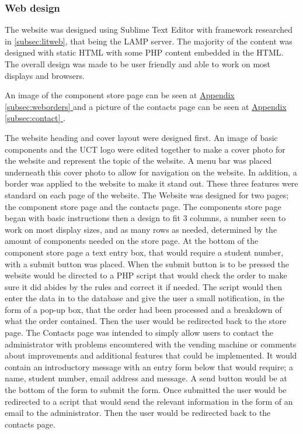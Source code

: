 \documentclass[a4paper,11pt]{article}
\newcommand*{\fullref}[1]{\hyperref[{#1}]{\Appendixautorefname  \ref*{#1} \nameref*{#1}}}
\newcommand*{\Appendixautorefname}{Appendix }
\numberwithin{figure}{section}
\numberwithin{table}{section}
\begin{document}
\subsubsection{Web design}
\label{subsubsec:webdev}

The website was designed using Sublime Text Editor with framework researched in \autoref{subsec:litweb}, that being the LAMP server. The majority of the content was designed with static HTML with some PHP content embedded in the HTML. The overall design was made to be user friendly and able to work on most displays and browsers.

An image of the component store page can be seen at \fullref{subsec:weborders} and a picture of the contacts page can be seen at \fullref{subsec:contact}.

The website heading and cover layout were designed first. An image of basic components and the UCT logo were edited together to make a cover photo for the website and represent the topic of the website. A menu bar was placed underneath this cover photo to allow for navigation on the website. In addition, a border was applied to the website to make it stand out. These three features were standard on each page of the website. The Website was designed for two pages; the component store page and the contacts page. The components store page began with basic instructions then a design to fit 3 columns, a number seen to work on most display sizes, and as many rows as needed, determined by the amount of components needed on the store page. At the bottom of the component store page a text entry box, that would require a student number, with a submit button was placed. When the submit button is to be pressed the website would be directed to a PHP script that would check the order to make sure it did abides by the rules and correct it if needed. The script would then enter the data in to the database and give the user a small notification, in the form of a pop-up box, that the order had been processed and a breakdown of what the order contained. Then the user would be redirected back to the store page. The Contacts page was intended to simply allow users to contact the administrator with problems encountered with the vending machine or comments about improvements and additional features that could be implemented. It would contain an introductory message with an entry form below that would require; a name, student number, email address and message. A send button would be at the bottom of the form to submit the form. Once submitted the user would be redirected to a script that would send the relevant information in the form of an email to the administrator. Then the user would be redirected back to the contacts page.
\end{document}
